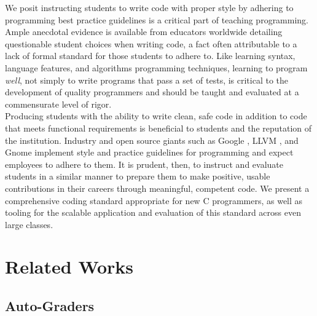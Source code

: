 \documentclass[sigconf]{acmart}
\begin{document}
We posit instructing students to write code with proper style by adhering to programming
best practice guidelines is a critical part of teaching programming. Ample anecdotal
evidence is available from educators worldwide detailing questionable student choices
when writing code, a fact often attributable to a lack of formal standard for those
students to adhere to. Like learning syntax, language features, and algorithms
programming techniques, learning to program \textit{well}, not simply to write programs
that pass a set of tests, is critical to the development of quality programmers
\cite{10.1145/3297156.3297227} and should be taught and evaluated at a commensurate level 
of rigor.
\\

Producing students with the ability to write clean, safe code in addition to code that
meets functional requirements is beneficial to students and the reputation of the
institution. Industry and open source giants such as Google \cite{GoogleCStyleGuide},
LLVM \cite{LLVMStyleGuide}, and Gnome \cite{GnomeStyleGuide} implement style and practice
guidelines for programming and expect employees to adhere to them. It is prudent, then,
to instruct and evaluate students in a similar manner to prepare them to make positive,
usable contributions in their careers through meaningful, competent code. We present a
comprehensive coding standard appropriate for new C programmers, as well as tooling for
the scalable application and evaluation of this standard across even large classes.
\\

\section{Related Works}

\subsection{Auto-Graders}
\end{document}
